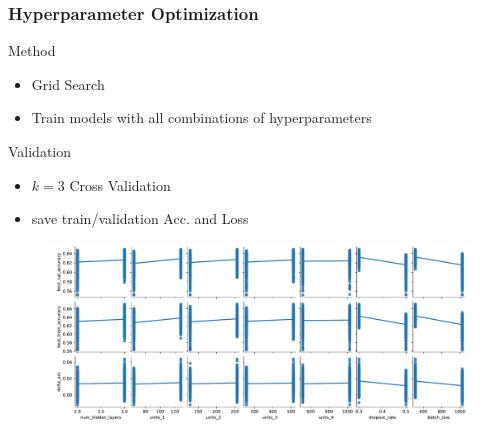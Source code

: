 \begin{frame}
    \frametitle{Hyperparameter Optimization}
    
    \begin{alertblock}{Method}
        \begin{itemize}
            \item Grid Search
            \item Train models with all combinations of hyperparameters
        \end{itemize}    
    \end{alertblock}

    \begin{alertblock}{Validation}
        \begin{itemize}
            \item $k=\num{3}$ Cross Validation
            \item save train/validation Acc. and Loss
        \end{itemize}
    \end{alertblock}

    \begin{figure}
        \includegraphics[scale=0.3]{../figures/HPO_parameter.pdf}
    \end{figure}

\end{frame}